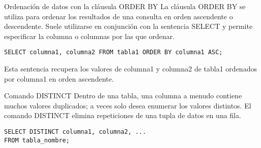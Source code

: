\begin{frame}[fragile]{Ordenación de datos con la cláusula ORDER BY}
\protect\hypertarget{ordenaciuxf3n-de-datos-con-la-cluxe1usula-order-by}{}
La cláusula ORDER BY se utiliza para ordenar los resultados de una
consulta en orden ascendente o descendente. Suele utilizarse en
conjunción con la sentencia SELECT y permite especificar la columna o
columnas por las que ordenar.

\texttt{SELECT\ columna1,\ columna2\ FROM\ tabla1\ ORDER\ BY\ columna1\ ASC;}

Esta sentencia recupera los valores de columna1 y columna2 de tabla1
ordenados por columna1 en orden ascendente.
\end{frame}

\begin{frame}[fragile]{Comando DISTINCT}
\protect\hypertarget{comando-distinct}{}
Dentro de una tabla, una columna a menudo contiene muchos valores
duplicados; a veces solo desea enumerar los valores distintos. El
comando DISTINCT elimina repeticiones de una tupla de datos en una fila.

\begin{verbatim}
SELECT DISTINCT columna1, columna2, ...
FROM tabla_nombre;
\end{verbatim}
\end{frame}
